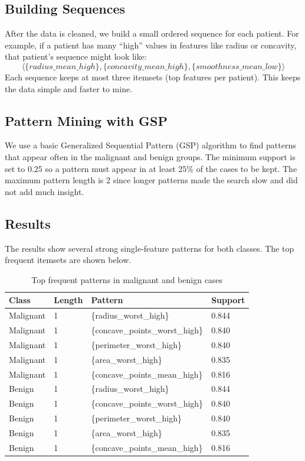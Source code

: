 \documentclass[12pt]{article}
\begin{document}
\subsection{Building Sequences}
After the data is cleaned, we build a small ordered sequence for each patient. 
For example, if a patient has many “high” values in features like radius or concavity, that patient’s sequence might look like:
\[
\langle \{radius\_mean\_high\}, \{concavity\_mean\_high\}, \{smoothness\_mean\_low\} \rangle
\]
Each sequence keeps at most three itemsets (top features per patient). 
This keeps the data simple and faster to mine.

\subsection{Pattern Mining with GSP}
We use a basic Generalized Sequential Pattern (GSP) algorithm to find patterns that appear often in the malignant and benign groups. 
The minimum support is set to 0.25 so a pattern must appear in at least 25\% of the cases to be kept. 
The maximum pattern length is 2 since longer patterns made the search slow and did not add much insight.

\subsection{Results}
The results show several strong single-feature patterns for both classes. 
The top frequent itemsets are shown below.

\begin{table}[H]
\centering
\begin{tabular}{|l|l|l|l|}
\hline
\textbf{Class} & \textbf{Length} & \textbf{Pattern} & \textbf{Support} \\ \hline
Malignant & 1 & \{radius\_worst\_high\} & 0.844 \\ \hline
Malignant & 1 & \{concave\_points\_worst\_high\} & 0.840 \\ \hline
Malignant & 1 & \{perimeter\_worst\_high\} & 0.840 \\ \hline
Malignant & 1 & \{area\_worst\_high\} & 0.835 \\ \hline
Malignant & 1 & \{concave\_points\_mean\_high\} & 0.816 \\ \hline
Benign & 1 & \{radius\_worst\_high\} & 0.844 \\ \hline
Benign & 1 & \{concave\_points\_worst\_high\} & 0.840 \\ \hline
Benign & 1 & \{perimeter\_worst\_high\} & 0.840 \\ \hline
Benign & 1 & \{area\_worst\_high\} & 0.835 \\ \hline
Benign & 1 & \{concave\_points\_mean\_high\} & 0.816 \\ \hline
\end{tabular}
\caption{Top frequent patterns in malignant and benign cases}
\end{table}
\end{document}
